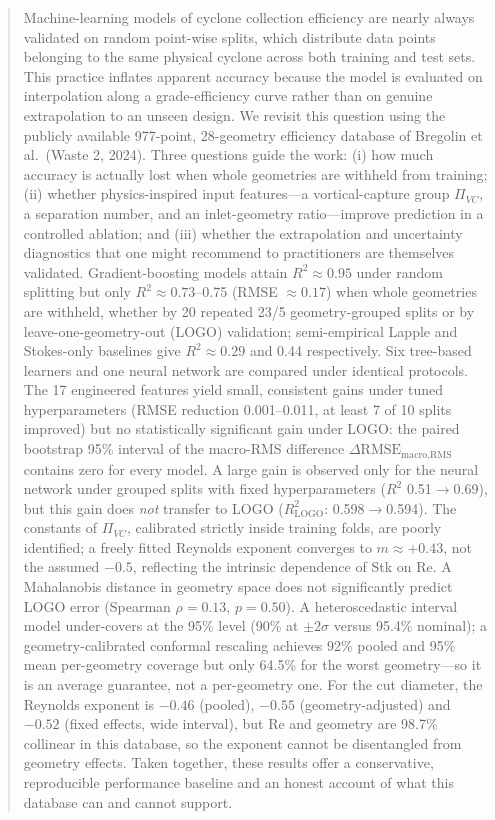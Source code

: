\documentclass[12pt]{article}
\newcommand{\PiVC}{\Pi_{VC}}
\begin{document}
\begin{abstract}
Machine-learning models of cyclone collection efficiency are nearly always validated on random point-wise splits, which distribute data points belonging to the same physical cyclone across both training and test sets. This practice inflates apparent accuracy because the model is evaluated on interpolation along a grade-efficiency curve rather than on genuine extrapolation to an unseen design. We revisit this question using the publicly available 977-point, 28-geometry efficiency database of Bregolin et al.\ (Waste 2, 2024). Three questions guide the work: (i) how much accuracy is actually lost when whole geometries are withheld from training; (ii) whether physics-inspired input features---a vortical-capture group $\PiVC$, a separation number, and an inlet-geometry ratio---improve prediction in a controlled ablation; and (iii) whether the extrapolation and uncertainty diagnostics that one might recommend to practitioners are themselves validated. Gradient-boosting models attain $R^2\approx0.95$ under random splitting but only $R^2\approx0.73$--0.75 (RMSE $\approx 0.17$) when whole geometries are withheld, whether by 20 repeated 23/5 geometry-grouped splits or by leave-one-geometry-out (LOGO) validation; semi-empirical Lapple and Stokes-only baselines give $R^2\approx0.29$ and 0.44 respectively. Six tree-based learners and one neural network are compared under identical protocols. The 17 engineered features yield small, consistent gains under tuned hyperparameters (RMSE reduction 0.001--0.011, at least 7 of 10 splits improved) but no statistically significant gain under LOGO: the paired bootstrap 95\% interval of the macro-RMS difference $\Delta\text{RMSE}_{\text{macro,RMS}}$ contains zero for every model. A large gain is observed only for the neural network under grouped splits with fixed hyperparameters ($R^2$ 0.51$\to$0.69), but this gain does \emph{not} transfer to LOGO ($R^2_{\text{LOGO}}$: 0.598$\to$0.594). The constants of $\PiVC$, calibrated strictly inside training folds, are poorly identified; a freely fitted Reynolds exponent converges to $m\approx+0.43$, not the assumed $-0.5$, reflecting the intrinsic dependence of Stk on Re. A Mahalanobis distance in geometry space does not significantly predict LOGO error (Spearman $\rho=0.13$, $p=0.50$). A heteroscedastic interval model under-covers at the 95\% level (90\% at $\pm2\sigma$ versus 95.4\% nominal); a geometry-calibrated conformal rescaling achieves 92\% pooled and 95\% mean per-geometry coverage but only 64.5\% for the worst geometry---so it is an average guarantee, not a per-geometry one. For the cut diameter, the Reynolds exponent is $-0.46$ (pooled), $-0.55$ (geometry-adjusted) and $-0.52$ (fixed effects, wide interval), but Re and geometry are 98.7\% collinear in this database, so the exponent cannot be disentangled from geometry effects. Taken together, these results offer a conservative, reproducible performance baseline and an honest account of what this database can and cannot support.
\end{abstract}
\end{document}
